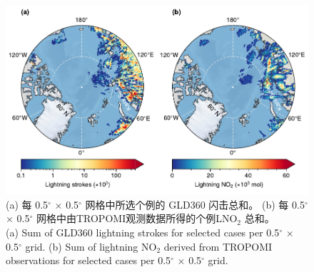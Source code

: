\begin{figure}[htbp]
\centering
\includegraphics[width=15cm]{./figures/arctic_lno2_production.pdf}
\caption{
(a) 每 0.5$^{\circ}$ $\times$ 0.5$^{\circ}$ 网格中所选个例的 GLD360 闪击总和。
(b) 每 0.5$^{\circ}$ $\times$ 0.5$^{\circ}$ 网格中由TROPOMI观测数据所得的个例LNO$_2$ 总和。\\
(a) Sum of GLD360 lightning strokes for selected cases per 0.5$^{\circ}$ $\times$ 0.5$^{\circ}$ grid.
(b) Sum of lightning NO$_2$ derived from TROPOMI observations for selected cases per 0.5$^{\circ}$ $\times$ 0.5$^{\circ}$ grid.
}
\label{fig:arctic_lno2_production}
\end{figure}

